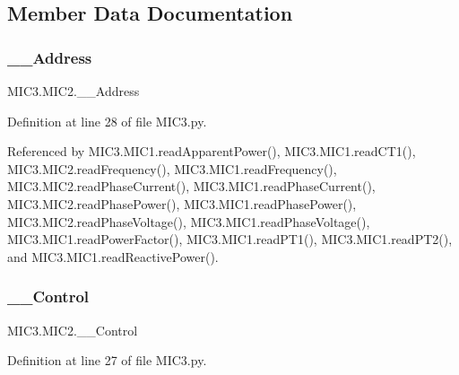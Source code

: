 \subsection{Member Data Documentation}
\mbox{\label{class_m_i_c3_1_1_m_i_c2_a7f0c5c34946f815efc1c4b3befdf3cca}} 
\subsubsection{\texorpdfstring{\+\_\+\+\_\+\+Address}{\_\_Address}}
{\footnotesize\ttfamily M\+I\+C3.\+M\+I\+C2.\+\_\+\+\_\+\+Address\hspace{0.3cm}{\ttfamily [private]}}



Definition at line 28 of file M\+I\+C3.\+py.



Referenced by M\+I\+C3.\+M\+I\+C1.\+read\+Apparent\+Power(), M\+I\+C3.\+M\+I\+C1.\+read\+C\+T1(), M\+I\+C3.\+M\+I\+C2.\+read\+Frequency(), M\+I\+C3.\+M\+I\+C1.\+read\+Frequency(), M\+I\+C3.\+M\+I\+C2.\+read\+Phase\+Current(), M\+I\+C3.\+M\+I\+C1.\+read\+Phase\+Current(), M\+I\+C3.\+M\+I\+C2.\+read\+Phase\+Power(), M\+I\+C3.\+M\+I\+C1.\+read\+Phase\+Power(), M\+I\+C3.\+M\+I\+C2.\+read\+Phase\+Voltage(), M\+I\+C3.\+M\+I\+C1.\+read\+Phase\+Voltage(), M\+I\+C3.\+M\+I\+C1.\+read\+Power\+Factor(), M\+I\+C3.\+M\+I\+C1.\+read\+P\+T1(), M\+I\+C3.\+M\+I\+C1.\+read\+P\+T2(), and M\+I\+C3.\+M\+I\+C1.\+read\+Reactive\+Power().

\mbox{\label{class_m_i_c3_1_1_m_i_c2_afc569cfb2ed2703bf1d6c6e0c7ba26ba}} 
\subsubsection{\texorpdfstring{\+\_\+\+\_\+\+Control}{\_\_Control}}
{\footnotesize\ttfamily M\+I\+C3.\+M\+I\+C2.\+\_\+\+\_\+\+Control\hspace{0.3cm}{\ttfamily [private]}}



Definition at line 27 of file M\+I\+C3.\+py.



